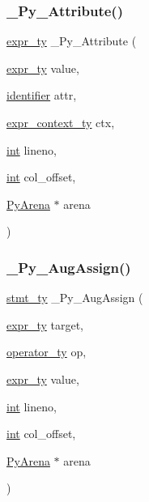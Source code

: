 \mbox{\label{_python-ast_8h_aee0b04133ba38fe51fc7d4195644c5d7}} 
\subsubsection{\texorpdfstring{\_Py\_Attribute()}{\_Py\_Attribute()}}
{\footnotesize\ttfamily \mbox{\hyperlink{_python-ast_8h_a56d3705e020a071405094a220c4592bd}{expr\+\_\+ty}} \+\_\+\+Py\+\_\+\+Attribute (\begin{DoxyParamCaption}\item[{\mbox{\hyperlink{_python-ast_8h_a56d3705e020a071405094a220c4592bd}{expr\+\_\+ty}}}]{value,  }\item[{\mbox{\hyperlink{asdl_8h_a78ca2081e230a95abc88c411c9816775}{identifier}}}]{attr,  }\item[{\mbox{\hyperlink{_python-ast_8h_a38710ce394ed6d5cc8ebe79a322dcdf9}{expr\+\_\+context\+\_\+ty}}}]{ctx,  }\item[{\mbox{\hyperlink{warnings_8h_a74f207b5aa4ba51c3a2ad59b219a423b}{int}}}]{lineno,  }\item[{\mbox{\hyperlink{warnings_8h_a74f207b5aa4ba51c3a2ad59b219a423b}{int}}}]{col\+\_\+offset,  }\item[{\mbox{\hyperlink{pyarena_8h_a9edeb357fbb27333471022a0975adb7a}{Py\+Arena}} $\ast$}]{arena }\end{DoxyParamCaption})}

\mbox{\label{_python-ast_8h_aa5441b53bbc02068d0348142c67109fa}} 
\subsubsection{\texorpdfstring{\_Py\_AugAssign()}{\_Py\_AugAssign()}}
{\footnotesize\ttfamily \mbox{\hyperlink{_python-ast_8h_a39618071027b661bc03e8916e664e1a7}{stmt\+\_\+ty}} \+\_\+\+Py\+\_\+\+Aug\+Assign (\begin{DoxyParamCaption}\item[{\mbox{\hyperlink{_python-ast_8h_a56d3705e020a071405094a220c4592bd}{expr\+\_\+ty}}}]{target,  }\item[{\mbox{\hyperlink{_python-ast_8h_a64ffe6085a53816a513038b9f1a04a9d}{operator\+\_\+ty}}}]{op,  }\item[{\mbox{\hyperlink{_python-ast_8h_a56d3705e020a071405094a220c4592bd}{expr\+\_\+ty}}}]{value,  }\item[{\mbox{\hyperlink{warnings_8h_a74f207b5aa4ba51c3a2ad59b219a423b}{int}}}]{lineno,  }\item[{\mbox{\hyperlink{warnings_8h_a74f207b5aa4ba51c3a2ad59b219a423b}{int}}}]{col\+\_\+offset,  }\item[{\mbox{\hyperlink{pyarena_8h_a9edeb357fbb27333471022a0975adb7a}{Py\+Arena}} $\ast$}]{arena }\end{DoxyParamCaption})}

